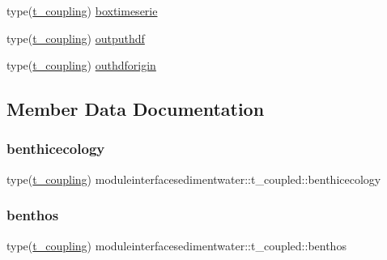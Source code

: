 \begin{DoxyCompactItemize}
\item 
type(\mbox{\hyperlink{structmoduleinterfacesedimentwater_1_1t__coupling}{t\+\_\+coupling}}) \mbox{\hyperlink{structmoduleinterfacesedimentwater_1_1t__coupled_aff7d137197af9f6c79729492b0a9adb7}{boxtimeserie}}
\item 
type(\mbox{\hyperlink{structmoduleinterfacesedimentwater_1_1t__coupling}{t\+\_\+coupling}}) \mbox{\hyperlink{structmoduleinterfacesedimentwater_1_1t__coupled_aa77e1145c96493c2b7136ad79d32dc54}{outputhdf}}
\item 
type(\mbox{\hyperlink{structmoduleinterfacesedimentwater_1_1t__coupling}{t\+\_\+coupling}}) \mbox{\hyperlink{structmoduleinterfacesedimentwater_1_1t__coupled_a274bb2d091dd876d3f11261422a99c90}{outhdforigin}}
\end{DoxyCompactItemize}


\subsection{Member Data Documentation}
\mbox{\label{structmoduleinterfacesedimentwater_1_1t__coupled_a357453414e8cab4ef1f0f1b12bf83cf9}} 
\subsubsection{\texorpdfstring{benthicecology}{benthicecology}}
{\footnotesize\ttfamily type(\mbox{\hyperlink{structmoduleinterfacesedimentwater_1_1t__coupling}{t\+\_\+coupling}}) moduleinterfacesedimentwater\+::t\+\_\+coupled\+::benthicecology\hspace{0.3cm}{\ttfamily [private]}}

\mbox{\label{structmoduleinterfacesedimentwater_1_1t__coupled_af8573158fc31f4a8f3ab13678e1fb1ee}} 
\subsubsection{\texorpdfstring{benthos}{benthos}}
{\footnotesize\ttfamily type(\mbox{\hyperlink{structmoduleinterfacesedimentwater_1_1t__coupling}{t\+\_\+coupling}}) moduleinterfacesedimentwater\+::t\+\_\+coupled\+::benthos\hspace{0.3cm}{\ttfamily [private]}}

